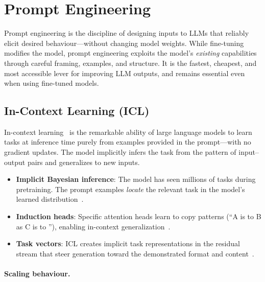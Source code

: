 \section{Prompt Engineering}
\label{sec:prompt-engineering}

Prompt engineering is the discipline of designing inputs to LLMs that reliably elicit desired behaviour---without changing model weights. While fine-tuning modifies the model, prompt engineering exploits the model’s \emph{existing} capabilities through careful framing, examples, and structure. It is the fastest, cheapest, and most accessible lever for improving LLM outputs, and remains essential even when using fine-tuned models.

\subsection{In-Context Learning (ICL)}
\label{in-context-learning-icl}

In-context learning~\cite{brown2020language} is the remarkable ability of large language models to learn tasks at inference time purely from examples provided in the prompt---with no gradient updates. The model implicitly infers the task from the pattern of input--output pairs and generalizes to new inputs.

\begin{keybox}
\begin{itemize}
  \item \textbf{Implicit Bayesian inference}: The model has seen millions of tasks during pretraining. The prompt examples \emph{locate} the relevant task in the model’s learned distribution~\cite{xie2022explanation}.
  \item \textbf{Induction heads}: Specific attention heads learn to copy patterns (``A is to B as C is to ''), enabling in-context generalization~\cite{olsson2022context}.
  \item \textbf{Task vectors}: ICL creates implicit task representations in the residual stream that steer generation toward the demonstrated format and content~\cite{todd2024function}.
\end{itemize}
\end{keybox}

\paragraph{Scaling behaviour.}
\label{scaling-behaviour.}

